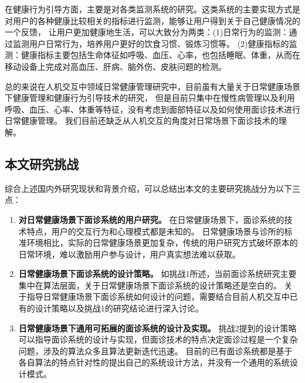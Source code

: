 在健康行为引导方面，主要是对各类监测系统的研究。这类系统的主要实现方式是对用户的各种健康比较相关的指标进行监测，能够让用户得到关于自己健康情况的一个反馈，
让用户更加健康地生活，可以大致分为两类：(1)日常行为的监测：通过监测用户日常行为，培养用户更好的饮食习惯、锻炼习惯等\cite{purpura2011fit4life, Inagawa2013A,bravata2007using,cordeiro2015barriers,lin2006fish, miller2014stepstream}。 
(2)健康指标的监测：健康指标主要包括生命体征如呼吸、血压、心率，也包括睡眠、体重，从而在移动设备上完成对高血压、肝病、脑外伤、皮肤问题的检测\cite{liang2020oralcam, wang2018seismo, mariakakis2017biliscreen}。

总的来说在人机交互中领域日常健康管理研究中，目前虽有大量关于日常健康场景下健康管理和健康行为引导技术的研究，
但是目前只集中在慢性病管理以及利用呼吸、血压、心率、体重等特征，没有考虑到面部特征以及如何使用面诊技术进行日常健康管理。
我们目前还缺乏从人机交互的角度对日常场景下面诊技术的理解。



\subsection{本文研究挑战}
综合上述国内外研究现状和背景介绍，可以总结出本文的主要研究挑战分为以下三点：
\begin{enumerate}
    \item \textbf{对日常健康场景下面诊系统的用户研究。}
    在日常健康场景下，面诊系统的技术特点，用户的交互行为和心理模式都是未知的。
    日常健康场景与诊所的标准环境相比，实际的日常健康场景更加复杂，传统的用户研究方式破坏原本的日常环境，难以激励用户参与设计，用户真实想法难以获取。

\item \textbf{日常健康场景下面诊系统的设计策略。}
    如挑战1所述，当前面诊系统研究主要集中在算法层面，关于日常健康场景下面诊系统的设计策略还是空白的。
    关于指导日常健康场景下面诊系统如何设计的问题，需要结合目前人机交互中已有的设计策略以及挑战1的研究结论进行深入讨论。

\item \textbf{日常健康场景下通用可拓展的面诊系统的设计及实现。}
    挑战2提到的设计策略可以指导面诊系统的设计与实现，但面诊技术的特点决定面诊过程是一个复杂问题，涉及的算法众多且算法更新迭代迅速。
    目前的已有面诊系统都是基于各自算法的特点针对性的提出自己的系统设计方法，并没有一个通用的系统设计模式。
    
\end{enumerate}
